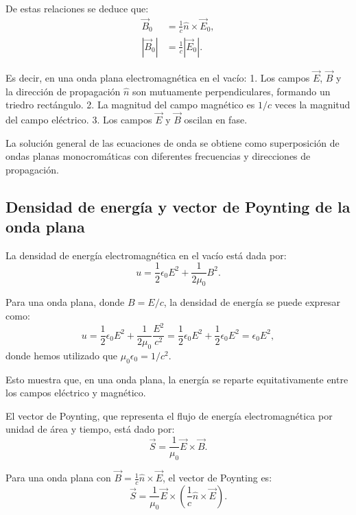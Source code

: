 \documentclass[12pt,a4paper]{book}
\begin{document}
De estas relaciones se deduce que:
\begin{align}
\vec{B}_0 &= \frac{1}{c}\hat{n} \times \vec{E}_0, \\
|\vec{B}_0| &= \frac{1}{c}|\vec{E}_0|.
\end{align}

Es decir, en una onda plana electromagnética en el vacío:
1. Los campos $\vec{E}$, $\vec{B}$ y la dirección de propagación $\hat{n}$ son mutuamente perpendiculares, formando un triedro rectángulo.
2. La magnitud del campo magnético es $1/c$ veces la magnitud del campo eléctrico.
3. Los campos $\vec{E}$ y $\vec{B}$ oscilan en fase.

La solución general de las ecuaciones de onda se obtiene como superposición de ondas planas monocromáticas con diferentes frecuencias y direcciones de propagación.

\subsection{Densidad de energía y vector de Poynting de la onda plana}

La densidad de energía electromagnética en el vacío está dada por:
\begin{equation}
u = \frac{1}{2}\epsilon_0 E^2 + \frac{1}{2\mu_0}B^2.
\end{equation}

Para una onda plana, donde $B = E/c$, la densidad de energía se puede expresar como:
\begin{equation}
u = \frac{1}{2}\epsilon_0 E^2 + \frac{1}{2\mu_0}\frac{E^2}{c^2} = \frac{1}{2}\epsilon_0 E^2 + \frac{1}{2}\epsilon_0 E^2 = \epsilon_0 E^2,
\end{equation}
donde hemos utilizado que $\mu_0 \epsilon_0 = 1/c^2$.

Esto muestra que, en una onda plana, la energía se reparte equitativamente entre los campos eléctrico y magnético.

El vector de Poynting, que representa el flujo de energía electromagnética por unidad de área y tiempo, está dado por:
\begin{equation}
\vec{S} = \frac{1}{\mu_0}\vec{E} \times \vec{B}.
\end{equation}

Para una onda plana con $\vec{B} = \frac{1}{c}\hat{n} \times \vec{E}$, el vector de Poynting es:
\begin{equation}
\vec{S} = \frac{1}{\mu_0}\vec{E} \times \left(\frac{1}{c}\hat{n} \times \vec{E}\right).
\end{equation}
\end{document}

